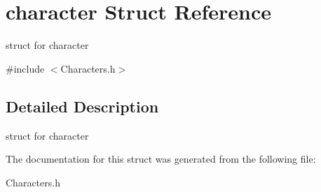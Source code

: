 \hypertarget{structcharacter}{}\section{character Struct Reference}
\label{structcharacter}


struct for character  




{\ttfamily \#include $<$Characters.\+h$>$}



\subsection{Detailed Description}
struct for character 

The documentation for this struct was generated from the following file\+:\begin{DoxyCompactItemize}
\item 
Characters.\+h\end{DoxyCompactItemize}
